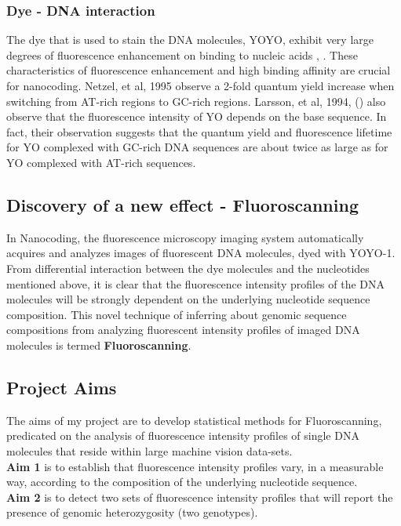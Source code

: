 \subsubsection*{Dye - DNA interaction} 
The dye that is used to stain the DNA molecules, YOYO, exhibit very large degrees of fluorescence enhancement on binding to nucleic acids \cite{Rye_etal_1992_NAR}, \cite{Lee_etal_1986_Cytometry}. These  characteristics of fluorescence enhancement and  high binding affinity are crucial for nanocoding. Netzel, et al, 1995 \cite{Netzel_etal_1995_JPC} observe a 2-fold quantum yield increase when switching from AT-rich regions to GC-rich regions. Larsson, et al, 1994, (\cite{Larsson_etal_1994_JACS}) also observe that the fluorescence intensity of YO depends on the base sequence. In fact, their observation suggests that the quantum yield and fluorescence lifetime for YO complexed with GC-rich DNA sequences are about twice as large as for YO complexed with AT-rich sequences. 

\subsection{Discovery of a new effect - Fluoroscanning} 
In Nanocoding, the fluorescence microscopy imaging system automatically acquires and analyzes images of fluorescent DNA molecules, dyed with YOYO-1. From differential interaction between the dye molecules and the nucleotides mentioned above, it is clear that the fluorescence intensity profiles of the DNA molecules will be strongly dependent on the underlying nucleotide sequence composition. This novel technique of inferring about genomic sequence compositions from analyzing fluorescent intensity profiles of imaged DNA molecules is termed {\bf{Fluoroscanning}}. 

\subsection{Project Aims} \label{Aims}
The aims of my project are to develop statistical methods for Fluoroscanning, predicated on the analysis of fluorescence intensity profiles of single DNA molecules that reside within large machine vision data-sets.\\
\noindent
{\bf{Aim 1}} is to establish that fluorescence intensity profiles vary, in a measurable way, according to the composition of the underlying nucleotide sequence. \\
\noindent
{\bf{Aim 2}} is to detect two sets of fluorescence intensity profiles that will report the presence of genomic heterozygosity (two genotypes).



